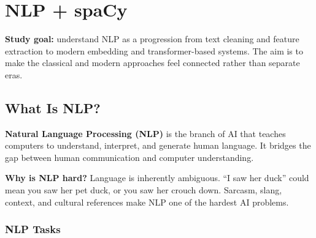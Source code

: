 \documentclass[12pt, a4paper, oneside]{book}
\begin{document}
\chapter{NLP + spaCy}

\begin{studybox}
\textbf{Study goal:} understand NLP as a progression from text cleaning and feature extraction to modern embedding and transformer-based systems. The aim is to make the classical and modern approaches feel connected rather than separate eras.
\end{studybox}

\section{What Is NLP?}

\textbf{Natural Language Processing (NLP)} is the branch of AI that teaches computers to understand, interpret, and generate human language. It bridges the gap between human communication and computer understanding.

\textbf{Why is NLP hard?} Language is inherently ambiguous. ``I saw her duck'' could mean you saw her pet duck, or you saw her crouch down. Sarcasm, slang, context, and cultural references make NLP one of the hardest AI problems.

\subsection{NLP Tasks}
\end{document}

